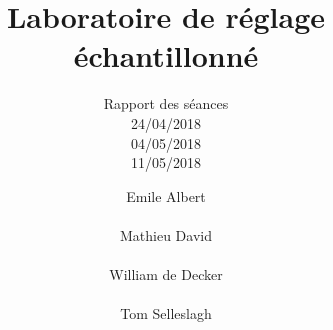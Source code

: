 \documentclass[10pt,a4paper]{article}
\title{Laboratoire de réglage échantillonné}
\subtitle{
	Rapport des séances\\[0.5cm]
	\large
	24/04/2018\\[5pt]
	04/05/2018\\[5pt]
	11/05/2018\\[5pt]
}
\author{
Emile Albert\\\\
Mathieu David\\\\
William de Decker\\\\
Tom Selleslagh\\\\
}
\begin{document}
\maketitlepage
\tableofcontents
\newpage


\end{document}
